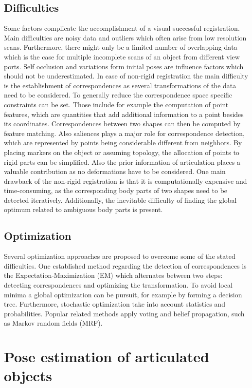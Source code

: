 \subsection{Difficulties}
Some factors complicate the accomplishment of a visual successful registration. Main difficulties are noisy data and outliers which often arise from low resolution scans. Furthermore, there might only be a limited number of overlapping data which is the case for multiple incomplete scans of an object from different view ports. Self occlusion and variations form initial poses are influence factors which should not be underestimated. In case of non-rigid registration the main difficulty is the establishment of correspondences as several transformations of the data need to be considered. To generally reduce the correspondence space specific constraints can be set. Those include for example the computation of point features, which are quantities that add additional information to a point besides its coordinates. Correspondences between two shapes can then be computed by feature matching. Also saliences plays a major role for correspondence detection, which are represented by points being considerable different from neighbors. By placing markers on the object or assuming topology, the allocation of points to rigid parts can be simplified. Also the prior information of articulation places a valuable contribution as no deformations have to be considered. 
One main drawback of the non-rigid registration is that it is computationally expensive and time-consuming, as the corresponding body parts of two shapes need to be detected iteratively. Additionally, the inevitable difficulty of finding the global optimum related to ambiguous body parts is present.

\subsection{Optimization}
Several optimization approaches are proposed to overcome some of the stated difficulties. One established method regarding the detection of correspondences is the Expectation-Maximization (EM) which alternates between two steps: detecting correspondences and optimizing the transformation. To avoid local minima a global optimization can be pursuit, for example by forming a decision tree. Furthermore, stochastic optimization take into account statistics and probabilities. Popular related methods apply voting and belief propagation, such as Markov random fields (MRF). 
%
\section{Pose estimation of articulated objects}
\label{poseEstimation}

